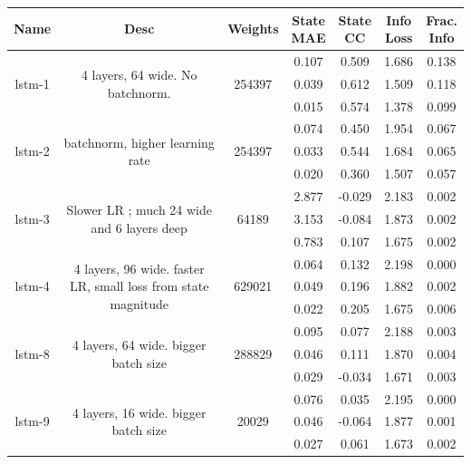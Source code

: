 \begin{table}[H]
\begin{sideways}
    \begin{tabular}{c|c|c|c|c|c|c }
    \small
Name & Desc & Weights & \thead{State\\MAE} & \thead{State\\CC} & \thead{Info\\Loss} &\thead{Frac.\\Info}\\
\hline
\multirow{3}{6em}{lstm-1} & \multirow{3}{16em}{4 layers, 64 wide. No batchnorm. } & \multirow{3}{4em}{254397} & 0.107 & 0.509 & 1.686 & 0.138 \\ & & & 0.039 & 0.612 & 1.509 & 0.118 \\ & & & 0.015 & 0.574 & 1.378 & 0.099 \\
\hline
\multirow{3}{6em}{lstm-2} & \multirow{3}{16em}{batchnorm, higher learning rate} & \multirow{3}{4em}{254397} & 0.074 & 0.450 & 1.954 & 0.067 \\ & & & 0.033 & 0.544 & 1.684 & 0.065 \\ & & & 0.020 & 0.360 & 1.507 & 0.057 \\
\hline
\multirow{3}{6em}{lstm-3} & \multirow{3}{16em}{Slower LR ; much 24 wide and 6 layers deep} & \multirow{3}{4em}{64189} & 2.877 & -0.029 & 2.183 & 0.002 \\ & & & 3.153 & -0.084 & 1.873 & 0.002 \\ & & & 0.783 & 0.107 & 1.675 & 0.002 \\
\hline
\multirow{3}{6em}{lstm-4} & \multirow{3}{16em}{4 layers, 96 wide. faster LR, small loss from state magnitude} & \multirow{3}{4em}{629021} & 0.064 & 0.132 & 2.198 & 0.000 \\ & & & 0.049 & 0.196 & 1.882 & 0.002 \\ & & & 0.022 & 0.205 & 1.675 & 0.006 \\
\hline
\multirow{3}{6em}{lstm-8} & \multirow{3}{16em}{4 layers, 64 wide. bigger batch size} & \multirow{3}{4em}{288829} & 0.095 & 0.077 & 2.188 & 0.003 \\ & & & 0.046 & 0.111 & 1.870 & 0.004 \\ & & & 0.029 & -0.034 & 1.671 & 0.003 \\
\hline
\multirow{3}{6em}{lstm-9} & \multirow{3}{16em}{4 layers, 16 wide. bigger batch size} & \multirow{3}{4em}{20029} & 0.076 & 0.035 & 2.195 & 0.000 \\ & & & 0.046 & -0.064 & 1.877 & 0.001 \\ & & & 0.027 & 0.061 & 1.673 & 0.002 \\

\end{tabular}
\end{sideways}
\end{table}
